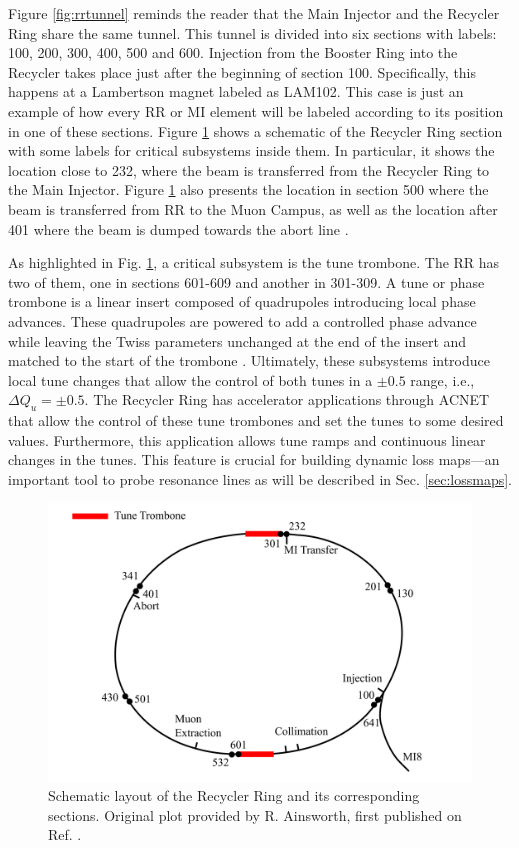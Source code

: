 Figure \ref{fig:rrtunnel} reminds the reader that the Main Injector and the Recycler Ring share the same tunnel. This tunnel is divided into six sections with labels: 100, 200, 300, 400, 500 and 600. Injection from the Booster Ring into the Recycler takes place just after the beginning of section 100. Specifically, this happens at a Lambertson magnet labeled as LAM102. This case is just an example of how every RR or MI element will be labeled according to its position in one of these sections. Figure \ref{fig:rrschematic} shows a schematic of the Recycler Ring section with some labels for critical subsystems inside them. In particular, it shows the location close to 232, where the beam is transferred from the Recycler Ring to the Main Injector. Figure \ref{fig:rrschematic} also presents the location in section 500 where the beam is transferred from RR to the Muon Campus, as well as the location after 401 where the beam is dumped towards the abort line \cite{rr1,fermi_rookie}.

As highlighted in Fig. \ref{fig:rrschematic}, a critical subsystem is the tune trombone. The RR has two of them, one in sections 601-609 and another in 301-309. A tune or phase trombone is a linear insert composed of quadrupoles introducing local phase advances. These quadrupoles are powered to add a controlled phase advance while leaving the Twiss parameters unchanged at the end of the insert and matched to the start of the trombone \cite{trombone,rr0}. Ultimately, these subsystems introduce local tune changes that allow the control of both tunes in a $\pm 0.5$ range, i.e., $\Delta Q_u = \pm 0.5$. The Recycler Ring has accelerator applications through ACNET that allow the control of these tune trombones and set the tunes to some desired values. Furthermore, this application allows tune ramps and continuous linear changes in the tunes. This feature is crucial for building dynamic loss maps---an important tool to probe resonance lines as will be described in Sec. \ref{sec:lossmaps}.    

\begin{figure}[H]
   \centering
   \includegraphics[width=\columnwidth]{chapter3/RRschematic.png}
   \caption{Schematic layout of the Recycler Ring and its corresponding sections. Original plot provided by R. Ainsworth, first published on Ref. \cite{rr1}.}
   \label{fig:rrschematic}
   \vspace{-1.25em}
\end{figure}

